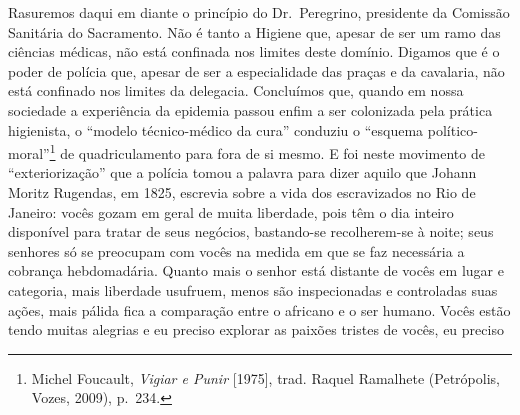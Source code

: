 Rasuremos daqui em diante o princípio do Dr.~Peregrino, presidente da
Comissão Sanitária do Sacramento. Não é tanto a Higiene que, apesar de
ser um ramo das ciências médicas, não está confinada nos limites deste
domínio. Digamos que é o poder de polícia que, apesar de ser a
especialidade das praças e da cavalaria, não está confinado nos limites
da delegacia. Concluímos que, quando em nossa sociedade a experiência da
epidemia passou enfim a ser colonizada pela prática higienista, o
``modelo técnico-médico da cura'' conduziu o ``esquema
político-moral''\footnote{Michel Foucault, \emph{Vigiar e Punir}
  {[}1975{]}, trad. Raquel Ramalhete (Petrópolis, Vozes, 2009), p.~234.}
de quadriculamento para fora de si mesmo. E foi neste movimento de
``exteriorização'' que a polícia tomou a palavra para dizer aquilo que
Johann Moritz Rugendas, em 1825, escrevia sobre a vida dos escravizados
no Rio de Janeiro: vocês gozam em geral de muita liberdade, pois têm o
dia inteiro disponível para tratar de seus negócios, bastando-se
recolherem-se à noite; seus senhores só se preocupam com vocês na medida
em que se faz necessária a cobrança hebdomadária. Quanto mais o senhor
está distante de vocês em lugar e categoria, mais liberdade usufruem,
menos são inspecionadas e controladas suas ações, mais pálida fica a
comparação entre o africano e o ser humano. Vocês estão tendo muitas
alegrias e eu preciso explorar as paixões tristes de vocês, eu preciso
